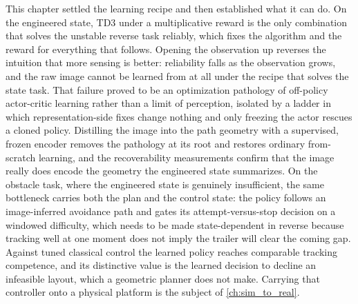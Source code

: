 This chapter settled the learning recipe and then established what it can do. On the engineered state, TD3 under a multiplicative reward is the only combination that solves the unstable reverse task reliably, which fixes the algorithm and the reward for everything that follows. Opening the observation up reverses the intuition that more sensing is better: reliability falls as the observation grows, and the raw image cannot be learned from at all under the recipe that solves the state task. That failure proved to be an optimization pathology of off-policy actor-critic learning rather than a limit of perception, isolated by a ladder in which representation-side fixes change nothing and only freezing the actor rescues a cloned policy. Distilling the image into the path geometry with a supervised, frozen encoder removes the pathology at its root and restores ordinary from-scratch learning, and the recoverability measurements confirm that the image really does encode the geometry the engineered state summarizes. On the obstacle task, where the engineered state is genuinely insufficient, the same bottleneck carries both the plan and the control state: the policy follows an image-inferred avoidance path and gates its attempt-versus-stop decision on a windowed difficulty, which needs to be made state-dependent in reverse because tracking well at one moment does not imply the trailer will clear the coming gap. Against tuned classical control the learned policy reaches comparable tracking competence, and its distinctive value is the learned decision to decline an infeasible layout, which a geometric planner does not make. Carrying that controller onto a physical platform is the subject of \cref{ch:sim_to_real}.
